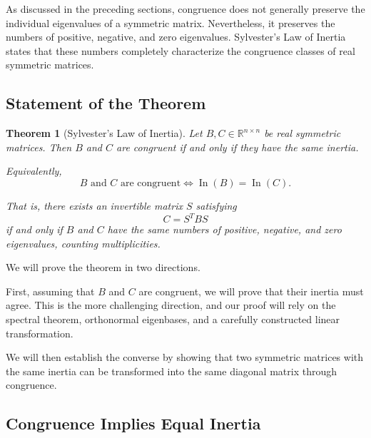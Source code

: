 \documentclass[11pt]{article}
\newtheorem{theorem}{Theorem}[section]
\theoremstyle{definition}
\theoremstyle{remark}
\begin{document}
As discussed in the preceding
sections, congruence does not generally preserve
the individual eigenvalues of a symmetric matrix.
Nevertheless, it preserves the numbers of positive,
negative, and zero eigenvalues. Sylvester's Law of Inertia states that these numbers
completely characterize the congruence classes of
real symmetric matrices.

\subsection{Statement of the Theorem}

\begin{theorem}[Sylvester's Law of Inertia]
Let $B,C\in\mathbb{R}^{n\times n}$ be real symmetric
matrices. Then $B$ and $C$ are congruent if and
only if they have the same inertia.

Equivalently,
\[
    \boxed{
    B\text{ and }C\text{ are congruent}
    \iff
    \operatorname{In}(B)=\operatorname{In}(C).
    }
\]

That is, there exists an invertible matrix $S$
satisfying
\[
    C=S^TBS
\]
if and only if $B$ and $C$ have the same numbers
of positive, negative, and zero eigenvalues,
counting multiplicities.
\end{theorem}

We will prove the theorem in two directions.

First, assuming that $B$ and $C$ are congruent,
we will prove that their inertia must agree.
This is the more challenging direction, and
our proof will rely on the spectral theorem,
orthonormal eigenbases, and a carefully
constructed linear transformation.

We will then establish the converse by showing
that two symmetric matrices with the same
inertia can be transformed into the same
diagonal matrix through congruence.


\subsection{Congruence Implies Equal Inertia}
\end{document}
